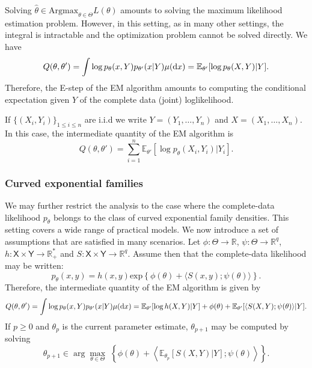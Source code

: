 \documentclass[english,graybox,envcountchap,envcountsame,sectrefs,shortlabels]{svmono}
\theoremstyle{style}
\newcommand{\eqsp}{}
\begin{document}
Solving $\widehat \theta \in\mathrm{Argmax}_{\theta\in\Theta} L(\theta)$ amounts to solving the maximum likelihood estimation problem. However, in this setting, as in many other settings, the integral is intractable and the optimization problem cannot be solved directly. We have
$$
Q(\theta,\theta') = \int \log p_\theta(x,Y)p_{\theta'}(x|Y)\mu(\rmd x) = \mathbb{E}_{\theta'}[\log p_\theta(X,Y)|Y]\eqsp.
$$
Therefore, the E-step of the EM algorithm amounts to computing the conditional expectation given $Y$ of the complete data (joint) loglikelihood. 

If $\{(X_i,Y_i)\}_{1\leq i  \leq n}$ are i.i.d we write $Y = (Y_1,\ldots,Y_n)$ and $X = (X_1,\ldots,X_n)$. In this case, the intermediate quantity of the EM algorithm is
$$
Q(\theta,\theta') = \sum_{i=1}^n \mathbb{E}_{\theta'}[\log p_\theta(X_i,Y_i)|Y_i]\eqsp.
$$

\subsubsection*{Curved exponential families}
We may further restrict the analysis to the case where the complete-data likelihood
$p_\theta$ belongs to the class of curved exponential family densities. This setting
covers a wide range of practical models. We now introduce a set of assumptions
that are satisfied in many scenarios. Let $\phi : \Theta \to \mathbb{R}$, $\psi : \Theta \to \mathbb{R}^q$, $h : \mathsf{X}\times \mathsf{Y} \to \mathbb{R}^*_+$ and
$S : \mathsf{X}\times \mathsf{Y} \to  \mathbb{R}^q$. Assume then that the complete-data likelihood may be written:
\[
p_\theta(x,y) = h(x,y)\mathrm{exp}\left\{\phi(\theta) + \langle S(x,y); \psi(\theta)\rangle \right\}\eqsp.
\]
Therefore, the intermediate quantity of the EM algorithm is given by
$$
Q(\theta,\theta') = \int \log p_\theta(x,Y)p_{\theta'}(x|Y)\mu(\rmd x) = \mathbb{E}_{\theta'}[\log h(X,Y)|Y] + \phi(\theta) +  \mathbb{E}_{\theta'}[\langle S(X,Y); \psi(\theta)\rangle|Y] \eqsp.
$$
If $p\geq 0 $ and $\theta_p$ is the current parameter estimate, $\theta_{p+1}$ may be computed by solving
$$
\theta_{p+1} \in  \arg\max_{\theta \in \Theta} \;\left\{ \phi(\theta) +  \left\langle \mathbb{E}_{\theta_p}[S(X,Y)|Y]; \psi(\theta)\right\rangle \right\}\eqsp.
$$
\end{document}
